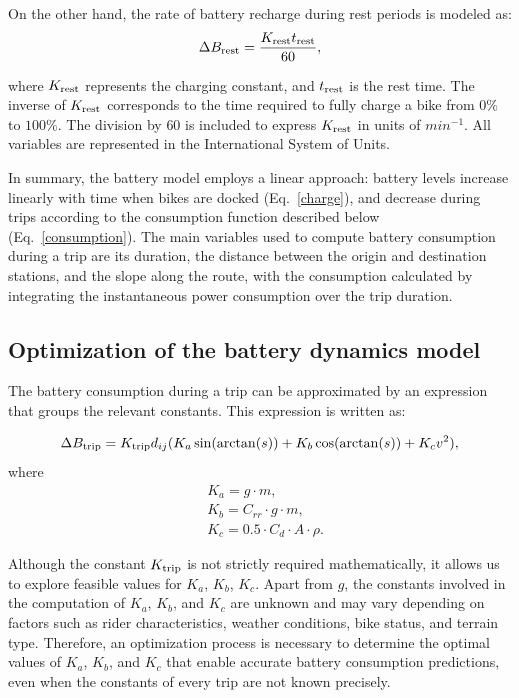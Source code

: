       On the other hand, the rate of battery recharge during rest periods is modeled as:
      \begin{equation}
      \Delta B_{\rm rest}=\frac{K_{\rm rest}t_{\rm rest}}{60}, \label{charge}
      \end{equation}

      where $K_{\rm rest}$ represents the charging constant, and $t_{\rm rest}$ is the rest time. The inverse of $K_{\rm rest}$ corresponds to the time required to fully charge a bike from $0\%$ to $100\%$. The division by $60$ is included to express $K_{\rm rest}$ in units of $min^{-1}$. All variables are represented in the International System of Units.

      In summary, the battery model employs a linear approach: battery levels increase linearly with time when bikes are docked (Eq.~\ref{charge}), and decrease during trips according to the consumption function described below (Eq.~\ref{consumption}). The main variables used to compute battery consumption during a trip are its duration, the distance between the origin and destination stations, and the slope along the route, with the consumption calculated by integrating the instantaneous power consumption over the trip duration.
    
      
      
    \subsection{Optimization of the battery dynamics model}
    \label{sec:battery_optimization}

      The battery consumption during a trip can be approximated by an expression that groups the relevant constants. This expression is written as:

        \begin{equation}
          \Delta B_{\rm trip}=K_{\rm trip} d_{ij}(K_a \sin(\arctan(s))+ K_b \cos(\arctan(s)) + K_c v^2), \label{consumption}
        \end{equation}
      where
        \begin{align*}
          & K_a=g \cdot m, \\
          & K_b={C_{rr}} \cdot g \cdot m, \\
          & K_c=0.5 \cdot C_d \cdot A \cdot \rho.
        \end{align*}

      Although the constant $K_{\rm trip}$ is not strictly required mathematically, it allows us to explore feasible values for $K_a$, $K_b$, $K_c$. Apart from $g$, the constants involved in the computation of $K_a$, $K_b$, and $K_c$ are unknown and may vary depending on factors such as rider characteristics, weather conditions, bike status, and terrain type. Therefore, an optimization process is necessary to determine the optimal values of $K_a$, $K_b$, and $K_c$ that enable accurate battery consumption predictions, even when the constants of every trip are not known precisely.

